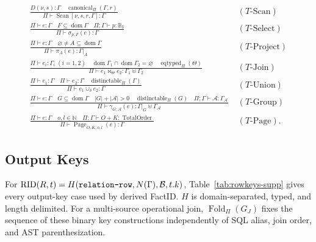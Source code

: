 \documentclass[journal,onecolumn]{IEEEtran}
\newcommand{\code}[1]{\texttt{\detokenize{#1}}}
\begin{document}
\begingroup\small
\begin{align*}
\frac{D(\nu,s):\Gamma\quad \operatorname{canonical}_\Pi(\Gamma,r)}
 {\Pi\vdash\operatorname{Scan}[\nu,s,r,\Gamma]:\Gamma}
&\;(T\text{-Scan})\\[1mm]
\frac{\Pi\vdash e:\Gamma\quad F\subseteq\operatorname{dom}\Gamma
      \quad \Pi;\Gamma\vdash p:\mathbb B_3}
 {\Pi\vdash\sigma_{p;F}(e):\Gamma}
&\;(T\text{-Select})\\[1mm]
\frac{\Pi\vdash e:\Gamma\quad \varnothing\ne A\subseteq\operatorname{dom}\Gamma}
 {\Pi\vdash\pi_A(e):\Gamma|_A}
&\;(T\text{-Project})\\[1mm]
\frac{\Pi\vdash e_i:\Gamma_i\;(i=1,2)\quad
      \operatorname{dom}\Gamma_1\cap\operatorname{dom}\Gamma_2=\varnothing
      \quad\operatorname{eqtyped}_\Pi(\Theta)}
 {\Pi\vdash e_1\bowtie_\Theta e_2:\Gamma_1\uplus\Gamma_2}
&\;(T\text{-Join})\\[1mm]
\frac{\Pi\vdash e_1:\Gamma\quad\Pi\vdash e_2:\Gamma
      \quad\operatorname{distinctable}_\Pi(\Gamma)}
 {\Pi\vdash e_1\cup_\delta e_2:\Gamma}
&\;(T\text{-Union})\\[1mm]
\frac{\Pi\vdash e:\Gamma\quad G\subseteq\operatorname{dom}\Gamma
      \quad |G|+|\mathcal A|>0\quad
      \operatorname{distinctable}_\Pi(G)\quad
      \Pi;\Gamma\vdash\mathcal A:\Gamma_{\mathcal A}}
 {\Pi\vdash\gamma_{G;\mathcal A}(e):\Gamma|_G\uplus\Gamma_{\mathcal A}}
&\;(T\text{-Group})\\[1mm]
\frac{\Pi\vdash e:\Gamma\quad o,l\in\mathbb N\quad
      \Pi;\Gamma\vdash O{+}K:\operatorname{TotalOrder}}
 {\Pi\vdash\operatorname{Page}_{O,K,o,l}(e):\Gamma}
&\;(T\text{-Page}).
\end{align*}
\endgroup

\subsection{Output Keys}

For $\operatorname{RID}(R,t)=H(\code{relation-row},N(\Gamma),\mathcal B,t.k)$,
Table~\ref{tab:rowkeys-supp} gives every output-key case used by derived FactID.
$H$ is domain-separated, typed, and length delimited.  For a multi-source
operational join, $\operatorname{Fold}_\Pi(G_J)$ fixes the sequence of these
binary key constructions independently of SQL alias, join order, and AST
parenthesization.
\end{document}
